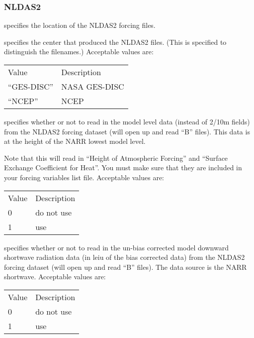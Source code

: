  
 \subsubsection{NLDAS2} \label{sssec:forcings_nldas2}
 

 
  specifies the location of the NLDAS2
 forcing files.

  specifies the center that produced
 the NLDAS2 files. (This is specified to distinguish the filenames.) 
 Acceptable values are:

 \begin{tabular}{ll}
 Value        & Description   \\
 ``GES-DISC'' & NASA GES-DISC \\
 ``NCEP''     & NCEP          \\
 \end{tabular}

  specifies whether or not to
 read in the model level data (instead of 2/10m fields) from the
 NLDAS2 forcing dataset (will open up and read ``B'' files).
 This data is at the height of the NARR lowest model level.

 Note that this will read in ``Height of Atmospheric Forcing''
 and ``Surface Exchange Coefficient for Heat''.  You must make
 sure that they are included in your forcing variables list file.
 Acceptable values are:

 \begin{tabular}{ll}
 Value & Description \\
 0     & do not use  \\
 1     & use         \\
 \end{tabular}

  specifies whether or not to
 read in the un-bias corrected model downward shortwave radiation 
 data (in leiu of the bias corrected data) from the NLDAS2 forcing
 dataset (will open up and read ``B'' files).  The data source is
 the NARR shortwave.
 Acceptable values are:

 \begin{tabular}{ll}
 Value & Description \\
 0     & do not use  \\
 1     & use         \\
 \end{tabular}

